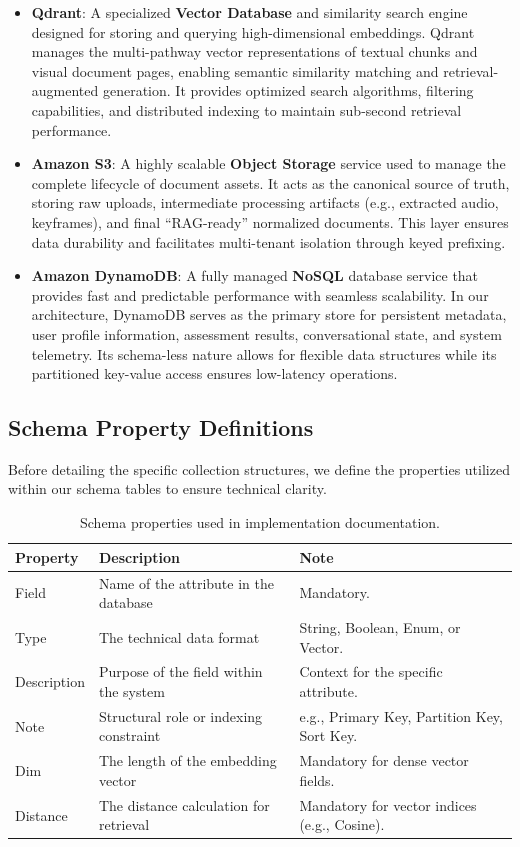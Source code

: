 \begin{itemize}
    \item \textbf{Qdrant}: A specialized \textbf{Vector Database} and similarity search engine designed for storing and querying high-dimensional embeddings. Qdrant manages the multi-pathway vector representations of textual chunks and visual document pages, enabling semantic similarity matching and retrieval-augmented generation. It provides optimized search algorithms, filtering capabilities, and distributed indexing to maintain sub-second retrieval performance.
    \item \textbf{Amazon S3}: A highly scalable \textbf{Object Storage} service used to manage the complete lifecycle of document assets. It acts as the canonical source of truth, storing raw uploads, intermediate processing artifacts (e.g., extracted audio, keyframes), and final ``RAG-ready'' normalized documents. This layer ensures data durability and facilitates multi-tenant isolation through keyed prefixing.
    \item \textbf{Amazon DynamoDB}: A fully managed \textbf{NoSQL} database service that provides fast and predictable performance with seamless scalability. In our architecture, DynamoDB serves as the primary store for persistent metadata, user profile information, assessment results, conversational state, and system telemetry. Its schema-less nature allows for flexible data structures while its partitioned key-value access ensures low-latency operations.
\end{itemize}

\subsection{Schema Property Definitions}
Before detailing the specific collection structures, we define the properties utilized within our schema tables to ensure technical clarity.

\begin{table}[H]
    \centering
    \caption{Schema properties used in implementation documentation.}
    \label{tab:schema_props}
    \begin{tabular}{llp{8cm}}
        \toprule
        \textbf{Property} & \textbf{Description} & \textbf{Note} \\
        \midrule
        Field & Name of the attribute in the database & Mandatory. \\
        Type & The technical data format & String, Boolean, Enum, or Vector. \\
        Description & Purpose of the field within the system & Context for the specific attribute. \\
        Note & Structural role or indexing constraint & e.g., Primary Key, Partition Key, Sort Key. \\
        \midrule
        Dim & The length of the embedding vector & Mandatory for dense vector fields. \\
        Distance & The distance calculation for retrieval & Mandatory for vector indices (e.g., Cosine). \\
        \bottomrule
    \end{tabular}
\end{table}

